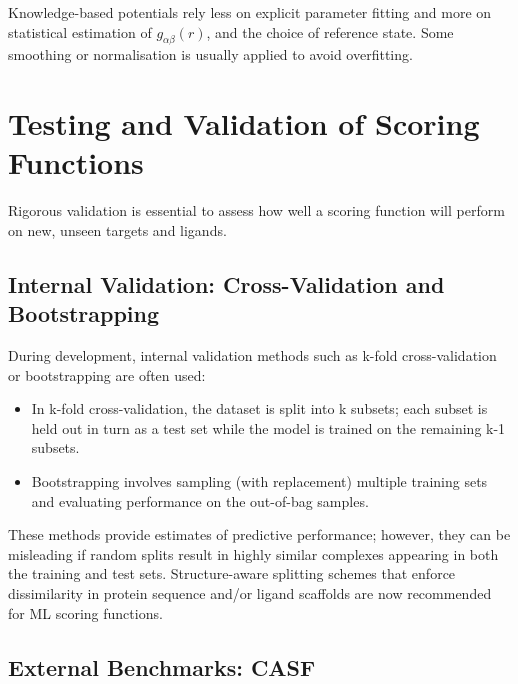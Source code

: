 \documentclass[12pt]{article}
\begin{document}
Knowledge-based potentials rely less on explicit parameter fitting and more on statistical estimation of $g_{\alpha\beta}(r)$, and the choice of reference state. Some smoothing or normalisation is usually applied to avoid overfitting.

\section{Testing and Validation of Scoring Functions}
Rigorous validation is essential to assess how well a scoring function will perform on new, unseen targets and ligands.

\subsection{Internal Validation: Cross-Validation and Bootstrapping}
During development, internal validation methods such as k-fold cross-validation or bootstrapping are often used:

\begin{itemize}
    \item In k-fold cross-validation, the dataset is split into k subsets; each subset is held out in turn as a test set while the model is trained on the remaining k-1 subsets.
    \item Bootstrapping involves sampling (with replacement) multiple training sets and evaluating performance on the out-of-bag samples.
\end{itemize}

These methods provide estimates of predictive performance; however, they can be misleading if random splits result in highly similar complexes appearing in both the training and test sets. Structure-aware splitting schemes that enforce dissimilarity in protein sequence and/or ligand scaffolds are now recommended for ML scoring functions\cite{CH3_li2017structural}.

\subsection{External Benchmarks: CASF}
\end{document}
